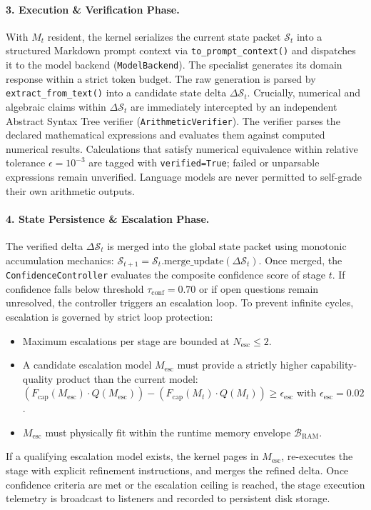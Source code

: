 \paragraph{3. Execution \& Verification Phase.}
With $M_t$ resident, the kernel serializes the current state packet $\mathcal{S}_t$ into a structured Markdown prompt context via \texttt{to\_prompt\_context()} and dispatches it to the model backend (\texttt{ModelBackend}). The specialist generates its domain response within a strict token budget. The raw generation is parsed by \texttt{extract\_from\_text()} into a candidate state delta $\Delta \mathcal{S}_t$. Crucially, numerical and algebraic claims within $\Delta \mathcal{S}_t$ are immediately intercepted by an independent Abstract Syntax Tree verifier (\texttt{ArithmeticVerifier}). The verifier parses the declared mathematical expressions and evaluates them against computed numerical results. Calculations that satisfy numerical equivalence within relative tolerance $\epsilon = 10^{-3}$ are tagged with \texttt{verified=True}; failed or unparsable expressions remain unverified. Language models are never permitted to self-grade their own arithmetic outputs.

\paragraph{4. State Persistence \& Escalation Phase.}
The verified delta $\Delta \mathcal{S}_t$ is merged into the global state packet using monotonic accumulation mechanics: $\mathcal{S}_{t+1} = \mathcal{S}_t.\text{merge\_update}(\Delta \mathcal{S}_t)$. Once merged, the \texttt{ConfidenceController} evaluates the composite confidence score of stage $t$. If confidence falls below threshold $\tau_{\text{conf}} = 0.70$ or if open questions remain unresolved, the controller triggers an escalation loop. To prevent infinite cycles, escalation is governed by strict loop protection:
\begin{itemize}
    \item Maximum escalations per stage are bounded at $N_{\text{esc}} \le 2$.
    \item A candidate escalation model $M_{\text{esc}}$ must provide a strictly higher capability-quality product than the current model: $(F_{\text{cap}}(M_{\text{esc}}) \cdot Q(M_{\text{esc}})) - (F_{\text{cap}}(M_t) \cdot Q(M_t)) \ge \epsilon_{\text{esc}}$ with $\epsilon_{\text{esc}} = 0.02$.
    \item $M_{\text{esc}}$ must physically fit within the runtime memory envelope $\mathcal{B}_{\text{RAM}}$.
\end{itemize}
If a qualifying escalation model exists, the kernel pages in $M_{\text{esc}}$, re-executes the stage with explicit refinement instructions, and merges the refined delta. Once confidence criteria are met or the escalation ceiling is reached, the stage execution telemetry is broadcast to listeners and recorded to persistent disk storage.

